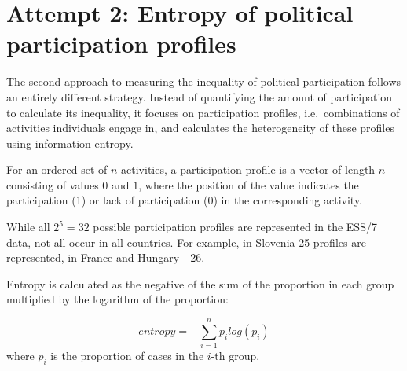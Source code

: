 \documentclass[12pt,]{article}
\begin{document}
\hypertarget{attempt-2-entropy-of-political-participation-profiles}{%
\section{Attempt 2: Entropy of political participation profiles}\label{attempt-2-entropy-of-political-participation-profiles}}

The second approach to measuring the inequality of political participation follows an entirely different strategy. Instead of quantifying the amount of participation to calculate its inequality, it focuses on participation profiles, i.e.~combinations of activities individuals engage in, and calculates the heterogeneity of these profiles using information entropy.

For an ordered set of \(n\) activities, a participation profile is a vector of length \(n\) consisting of values \(0\) and \(1\), where the position of the value indicates the participation (1) or lack of participation (0) in the corresponding activity.

\begin{table}[H]

\caption{\label{tab:ess-part-profile}Creating participation profiles, example.}
\centering
{}
\end{table}

While all \(2^5=32\) possible participation profiles are represented in the ESS/7 data, not all occur in all countries. For example, in Slovenia 25 profiles are represented, in France and Hungary - 26.

Entropy is calculated as the negative of the sum of the proportion in each group multiplied by the logarithm of the proportion:

\[ entropy =-\sum_{i=1}^{n} p_i log(p_i) \]
where \(p_i\) is the proportion of cases in the \(i\)-th group.
\end{document}
